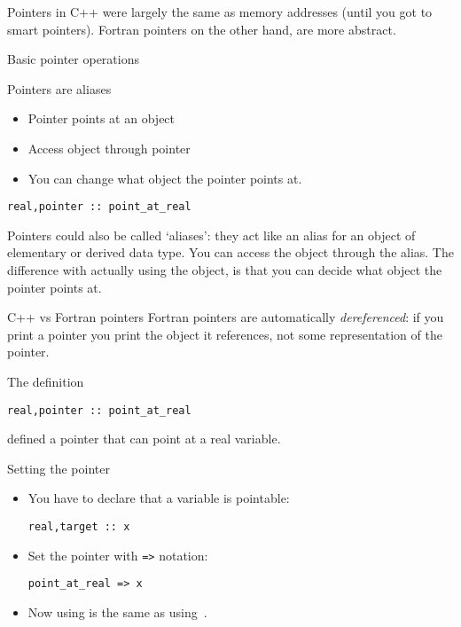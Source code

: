 
Pointers in C++ were largely the same as memory addresses (until you
got to smart pointers). Fortran pointers on the other hand, are more
abstract.

 {Basic pointer operations}

\begin{block}{Pointers are aliases}
  \label{sl:fpoint}
  \begin{itemize}
  \item Pointer points at an object
  \item Access object through pointer
  \item You can change what object the pointer points at.
  \end{itemize}
\begin{verbatim}
real,pointer :: point_at_real
\end{verbatim}
\end{block}

Pointers could also be called `aliases': they act like an alias for an
object of elementary or derived data type. You can access the object
through the alias. The difference with actually using the object, is
that you can decide what object the pointer points at.

\begin{block}{C++ vs Fortran pointers}
  \label{sl:cpoint-vs-fpoint}
  Fortran pointers are automatically
  \emph{dereferenced}: if you print a
  pointer you print the object it references, not some representation
  of the pointer.
\end{block}

The  definition
\begin{verbatim}
real,pointer :: point_at_real
\end{verbatim}
defined a pointer that can point at a real variable.

\begin{block}{Setting the pointer}
  \label{sl:fpoint-set}
  \begin{itemize}
  \item You have to declare that a variable is pointable:
\begin{verbatim}
real,target :: x
\end{verbatim}
\item Set the pointer with \verb+=>+ notation:
\begin{verbatim}
point_at_real => x
\end{verbatim}
\item Now using  is the same as using~.
  \end{itemize}
\end{block}


